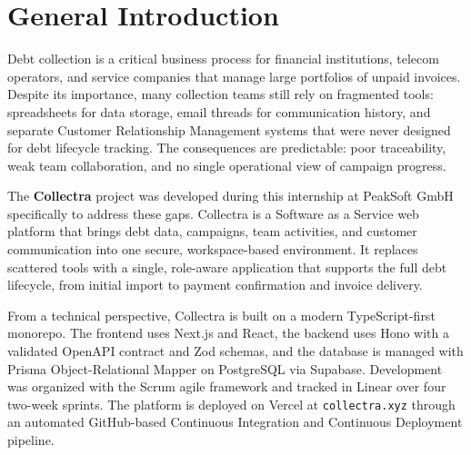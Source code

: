 ﻿\documentclass[12pt,a4paper]{report}
\begin{document}
\clearpage


\hypersetup{linkcolor=black, urlcolor=black, citecolor=black}
\tableofcontents
\clearpage


\listoffigures
\clearpage


\listoftables
\clearpage
\hypersetup{linkcolor=blue, urlcolor=blue, citecolor=blue}

\chapter*{General Introduction}
{}

Debt collection is a critical business process for financial institutions, telecom
operators, and service companies that manage large portfolios of unpaid invoices.
Despite its importance, many collection teams still rely on fragmented tools:
spreadsheets for data storage, email threads for communication history, and separate
Customer Relationship Management systems that were never designed for debt lifecycle tracking.
The consequences are predictable: poor traceability, weak team collaboration, and no
single operational view of campaign progress.

The \textbf{Collectra} project was developed during this internship at PeakSoft GmbH
specifically to address these gaps.
Collectra is a Software as a Service web platform that brings debt data, campaigns, team activities,
and customer communication into one secure, workspace-based environment.
It replaces scattered tools with a single, role-aware application that supports the
full debt lifecycle, from initial import to payment confirmation and invoice delivery.

From a technical perspective, Collectra is built on a modern TypeScript-first monorepo.
The frontend uses Next.js and React, the backend uses Hono with a validated OpenAPI
contract and Zod schemas, and the database is managed with Prisma Object-Relational Mapper on PostgreSQL
via Supabase.
Development was organized with the Scrum agile framework and tracked in Linear over
four two-week sprints.
The platform is deployed on Vercel at \texttt{collectra.xyz} through an automated
GitHub-based Continuous Integration and Continuous Deployment pipeline.
\end{document}
